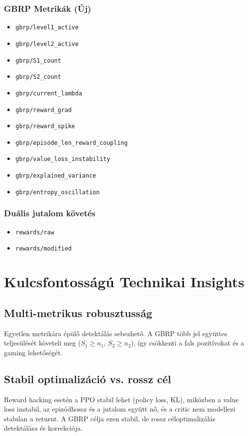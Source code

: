 \documentclass{article}
\begin{document}
\subsubsection{GBRP Metrikák (Új)}
\begin{itemize}
    \item \texttt{gbrp/level1\_active}
    \item \texttt{gbrp/level2\_active}
    \item \texttt{gbrp/S1\_count}
    \item \texttt{gbrp/S2\_count}
    \item \texttt{gbrp/current\_lambda}
    \item \texttt{gbrp/reward\_grad}
    \item \texttt{gbrp/reward\_spike}
    \item \texttt{gbrp/episode\_len\_reward\_coupling}
    \item \texttt{gbrp/value\_loss\_instability}
    \item \texttt{gbrp/explained\_variance}
    \item \texttt{gbrp/entropy\_oscillation}
\end{itemize}

\subsubsection{Duális jutalom követés}
\begin{itemize}
    \item \texttt{rewards/raw}
    \item \texttt{rewards/modified}
\end{itemize}

\section{Kulcsfontosságú Technikai Insights}

\subsection{Multi-metrikus robusztusság}
Egyetlen metrikára épülő detektálás sebezhető. A GBRP több jel együttes teljesülését követeli meg ($S_1\ge n_1$, $S_2\ge n_2$), így csökkenti a fals pozitívokat és a gaming lehetőségét.

\subsection{Stabil optimalizáció vs. rossz cél}
Reward hacking esetén a PPO stabil lehet (policy loss, KL), miközben a value loss instabil, az epizódhossz és a jutalom együtt nő, és a critic nem modellezi stabilan a returnt. A GBRP célja ezen stabil, de rossz céloptimalizálás detektálása és korrekciója.
\end{document}
